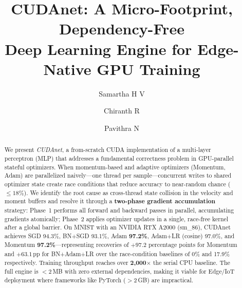 \documentclass[runningheads]{llncs}
\begin{document}
%
\title{CUDAnet: A Micro-Footprint, Dependency-Free\\
Deep Learning Engine for Edge-Native GPU Training}
%
%
\author{Samartha H V \and
Chiranth R \and
Pavithra N}
%
%
%
\maketitle
%
\begin{abstract}
We present \textit{CUDAnet}, a from-scratch CUDA implementation of a
multi-layer perceptron (MLP) that addresses a fundamental correctness
problem in GPU-parallel stateful optimizers. When momentum-based and
adaptive optimizers (Momentum, Adam) are parallelized naively—one thread
per sample—concurrent writes to shared optimizer state create race
conditions that reduce accuracy to near-random chance ($\leq\!18\%$). We
identify the root cause as cross-thread state collision in the velocity
and moment buffers and resolve it through a \textbf{two-phase gradient
accumulation} strategy: Phase~1 performs all forward and backward passes
in parallel, accumulating gradients atomically; Phase~2 applies optimizer
updates in a single, race-free kernel after a global barrier. On MNIST
with an NVIDIA RTX A2000 (sm\_86), CUDAnet achieves SGD 94.3\%,
BN+SGD 93.1\%, Adam \textbf{97.2\%}, Adam+LR (cosine) 97.0\%, and
Momentum \textbf{97.2\%}—representing recoveries of $+97.2$ percentage
points for Momentum and $+63.1$\,pp for BN+Adam+LR over the
race-condition baselines of 0\% and 17.9\% respectively. Training
throughput reaches over \textbf{2{,}000$\times$} the serial CPU baseline.
The full engine is $<$2\,MB with zero external dependencies, making it
viable for Edge/IoT deployment where frameworks like PyTorch ($>$2\,GB)
are impractical.

\end{abstract}
\end{document}
